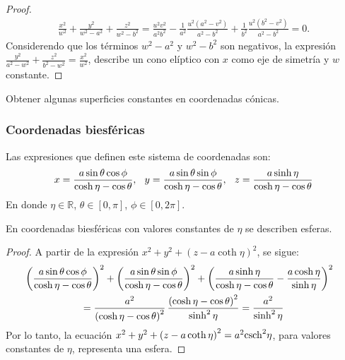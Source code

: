 \begin{proof}
\begin{multline*}
\frac{x^2}{w^2}+\frac{y^2}{w^2-a^2}+\frac{z^2}{w^2-b^2}
= \frac{u^2v^2}{a^2b^2}-\frac{1}{a^2}\frac{u^2\left( a^2-v^2\right)}{a^2-b^2}
+\frac{1}{b^2}\frac{u^2\left(b^2-v^2\right) }{a^2-b^2} = 0.
\end{multline*}
Considerendo que los términos $w^2-a^2$ y $w^2-b^2$ son negativos, la expresión
$\frac{y^2}{a^2-w^2}+\frac{z^2}{b^2-w^2}=\frac{x^2}{w^2}$,
describe un cono elíptico con $x$ como eje de simetría y $w$ constante.

\end{proof}
\begin{ejer}
Obtener algunas superficies constantes en coordenadas cónicas.
\end{ejer}

\subsubsection{Coordenadas biesféricas} 

Las expresiones que definen este sistema de coordenadas son:
\begin{equation}
x = \frac{a\sin \theta \cos \phi }{\cosh \eta -\cos \theta} ,\hskip0.25cm y = \frac{a\sin \theta \sin \phi }{\cosh \eta -\cos \theta }, \hskip0.25cm z=\frac{a\sinh \eta }{\cosh \eta -\cos \theta}
\end{equation}
En donde $\eta \in \mathbb{R}$, $\theta \in [0,\pi] $, $\phi \in [0,2\pi] $.

\begin{prop}
En coordenadas biesféricas con valores constantes de $\eta $ se describen esferas.
\end{prop}

\begin{proof}
A partir de la expresión $x^2+y^2+\left( z-a\coth \eta \right) ^2$, se sigue:
\begin{multline*}
\hskip-0.3cm \left( \frac{a\sin \theta\cos \phi }{\cosh \eta -\cos \theta }\right)^2+\left(\frac{a\sin \theta
\sin \phi }{\cosh \eta -\cos \theta }\right) ^2+\left( \frac{a\sinh \eta}{\cosh \eta -\cos \theta }-\frac{a\cosh \eta }{\sinh \eta }\right) ^2 \\
= \frac{a^2}{\left( \cosh \eta -\cos \theta \right) ^2} \,\frac{\left(
\cosh \eta -\cos \theta \right) ^2}{\sinh ^2\eta } = \frac{a^2}{\sinh ^2\eta }
\end{multline*}
Por lo tanto, la ecuación $x^2+y^2+\left( z-a\coth \eta \right)^2= a^2 {\rm csch} ^2\eta$,
para valores constantes de $\eta $, representa una esfera.
\end{proof}

